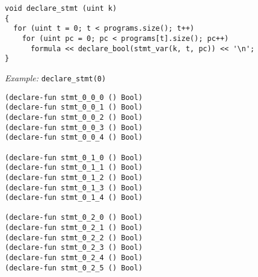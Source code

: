 





\begin{lstlisting}[style=c++]
void declare_stmt (uint k)
{
  for (uint t = 0; t < programs.size(); t++)
    for (uint pc = 0; pc < programs[t].size(); pc++)
      formula << declare_bool(stmt_var(k, t, pc)) << '\n';
}
\end{lstlisting}

\noindent
\emph{Example:} \lstinline[style=c++]{declare_stmt(0)}

\begin{lstlisting}[language=SMTLib]
(declare-fun stmt_0_0_0 () Bool)
(declare-fun stmt_0_0_1 () Bool)
(declare-fun stmt_0_0_2 () Bool)
(declare-fun stmt_0_0_3 () Bool)
(declare-fun stmt_0_0_4 () Bool)

(declare-fun stmt_0_1_0 () Bool)
(declare-fun stmt_0_1_1 () Bool)
(declare-fun stmt_0_1_2 () Bool)
(declare-fun stmt_0_1_3 () Bool)
(declare-fun stmt_0_1_4 () Bool)

(declare-fun stmt_0_2_0 () Bool)
(declare-fun stmt_0_2_1 () Bool)
(declare-fun stmt_0_2_2 () Bool)
(declare-fun stmt_0_2_3 () Bool)
(declare-fun stmt_0_2_4 () Bool)
(declare-fun stmt_0_2_5 () Bool)
\end{lstlisting}

